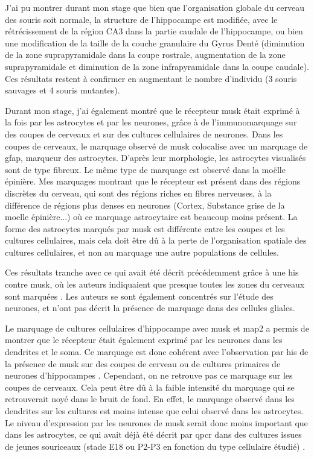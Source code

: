 J'ai pu montrer durant mon stage que bien que l'organisation globale du cerveau des souris \mcrd soit normale, la structure de l'hippocampe est modifiée, avec le rétrécissement de la région CA3 dans la partie caudale de l'hippocampe, ou bien une modification de la taille de la couche granulaire du Gyrus Denté (diminution de la zone suprapyramidale dans la coupe rostrale, augmentation de la zone suprapyramidale et diminution de la zone infrapyramidale dans la coupe caudale). Ces résultats restent à confirmer en augmentant le nombre d'individu (3 souris sauvages et 4 souris mutantes).

Durant mon stage, j'ai également montré que le récepteur \gls{musk} était exprimé à la fois par les astrocytes et par les neurones, grâce à de l'immunomarquage sur des coupes de cerveaux et sur des cultures cellulaires de neurones. Dans les coupes de cerveaux, le marquage observé de \gls{musk} colocalise avec un marquage de \gls{gfap}, marqueur des astrocytes. D'après leur morphologie, les astrocytes visualisés sont de type fibreux. Le même type de marquage est observé dans la moëlle épinière. Mes marquages montrant que le récepteur est présent dans des régions discrètes du cerveau, qui sont des régions riches en fibres nerveuses, à la différence de régions plus denses en neurones (Cortex, Substance grise de la moelle épinière...) où ce marquage astrocytaire est beaucoup moins présent. La forme des astrocytes marqués par \gls{musk} est différente entre les coupes et les cultures cellulaires, mais cela doit être dû à la perte de l'organisation spatiale des cultures cellulaires, et non au marquage une autre populations de cellules.

Ces résultats tranche avec ce qui avait été décrit précédemment grâce à une \acrlong{his} contre \gls{musk}, où les auteurs indiquaient que presque toutes les zones du cerveaux sont marquées \cite{Garcia-Osta2006}. Les auteurs se sont également concentrés sur l'étude des neurones, et n'ont pas décrit la présence de marquage dans des cellules gliales.

Le marquage de cultures cellulaires d'hippocampe avec \gls{musk} et \gls{map2} a permis de montrer que le récepteur était également exprimé par les neurones dans les dendrites et le soma. Ce marquage est donc cohérent avec l'observation par \acrlong{his} de la présence de \gls{musk} sur des coupes de cerveau ou de cultures primaires de neurones d'hippocampes \cite{Garcia-Osta2006}. Cependant, on ne retrouve pas ce marquage sur les coupes de cerveaux. Cela peut être dû à la faible intensité du marquage qui se retrouverait noyé dans le bruit de fond. En effet, le marquage observé dans les dendrites sur les cultures est moins intense que celui observé dans les astrocytes. Le niveau d'expression par les neurones de \gls{musk} serait donc moins important que dans les astrocytes, ce qui avait déjà été décrit par \gls{qpcr} dans des cultures issues de jeunes souriceaux (stade E18 ou P2-P3 en fonction du type cellulaire étudié) \cite{Sun2016}. 

